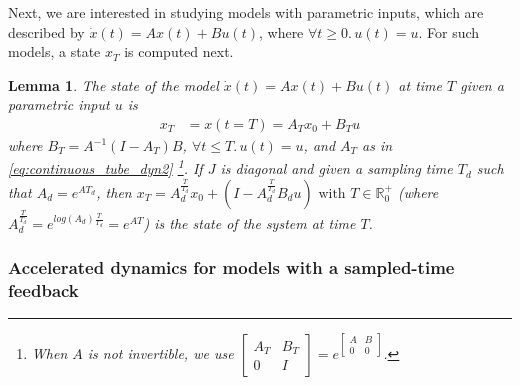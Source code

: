 \documentclass[twocolumn]{autart}    %
\newcommand{\mat}[1]{{#1}}
\renewcommand{\vec}[1]{{#1}}
\newtheorem{lemma}{Lemma}
\begin{document}
Next, we are interested in studying models with parametric inputs, which are
described by $\dot{\vec{x}}(t)=\mat{A}\vec{x}(t)+\mat{B}\vec{u}(t)$, where
$\forall t\geq 0.\,\vec{u}(t)=\vec{u}$.  For such models, a state $\vec{x}_T$
is computed next.
%
\begin{lemma}
%
The state of the model
$\dot{\vec{x}}(t)=\mat{A}\vec{x}(t)+\mat{B}\vec{u}(t)$ at time $T$ given a
parametric input $\vec{u}$ is
%
\begin{align}
\vec{x}_T&=\vec{x}(t=T)=\mat{A}_T\vec{x}_0 + \mat{B}_T\vec{u}
\label{eq:continuous_tube_param}
\end{align}
%
where $\mat{B}_T=\mat{A}^{-1}(\mat{I}-\mat{A}_T)\mat{B}$, $\forall t \leq T.\, \vec{u}(t)=\vec{u}$, and $\mat{A}_T$ as in
\eqref{eq:continuous_tube_dyn2} \footnote{When $\mat{A}$ is not invertible,
we use $\left[\begin{array}{cc}\mat{A}_T&\mat{B}_T\\
0&\mat{I}\end{array}\right]=e^{\left[\begin{array}{cc}\mat{A}&\mat{B}\\0&0\end{array}\right]}$.}. 
If $\mat{J}$ is diagonal and given a sampling time $T_d$ such that
$A_d=e^{\mat{A} T_d}$, then
$\vec{x}_T=A_d^{\frac{T}{T_d}}\vec{x}_0+(\mat{I}-\mat{A}_d^{\frac{T}{T_d}}\mat{B}_d\vec{u})
\text{ with } T \in \mathbb{R}_0^+$ (where $\mat{A}_d^{\frac{T}{T_d}} =
e^{log(\mat{A}_d) \frac{T}{T_d}} = e^{\mat{A} T}$) is the state of the
system at time $T$.
%
\end{lemma}

\subsubsection{Accelerated dynamics for models with a sampled-time feedback}\label{sec:real_discrete_feedback_inputs}
\end{document}
